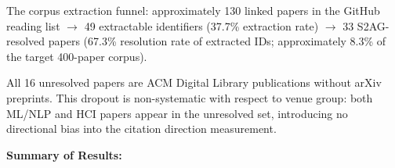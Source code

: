 The corpus extraction funnel: approximately 130 linked papers in the GitHub reading list $\rightarrow$ 49 extractable identifiers (37.7\% extraction rate) $\rightarrow$ 33 S2AG-resolved papers (67.3\% resolution rate of extracted IDs; approximately 8.3\% of the target 400-paper corpus).

All 16 unresolved papers are ACM Digital Library publications without arXiv preprints. This dropout is non-systematic with respect to venue group: both ML/NLP and HCI papers appear in the unresolved set, introducing no directional bias into the citation direction measurement.

\textbf{Summary of Results:}

\begin{table}[htbp]
\centering
{}
\end{table}

